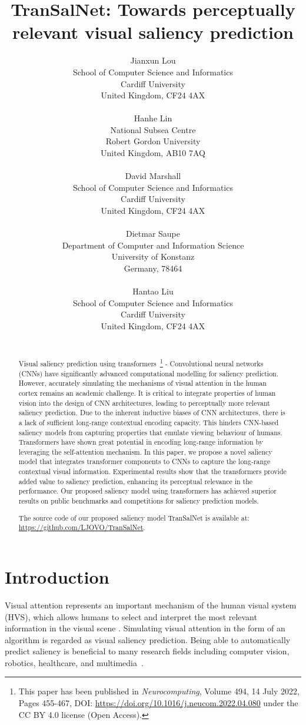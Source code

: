 \documentclass{article}
\title{TranSalNet: Towards perceptually relevant visual saliency prediction}
\date{}
\author{ 
Jianxun Lou \\
School of Computer Science and Informatics\\
Cardiff University\\
United Kingdom, CF24 4AX \\
\\
\And
Hanhe Lin \\
National Subsea Centre\\
Robert Gordon University\\
United Kingdom, AB10 7AQ \\
\\
\And
David Marshall \\
School of Computer Science and Informatics\\
Cardiff University\\
United Kingdom, CF24 4AX \\
\\
\And
Dietmar Saupe \\
Department of Computer and Information Science\\
University of Konstanz\\
Germany, 78464 \\
\\
\And
Hantao Liu \\
School of Computer Science and Informatics\\
Cardiff University\\
United Kingdom, CF24 4AX \\
\\
}
\begin{document}
\maketitle

\begin{abstract}
Visual saliency prediction using transformers~\footnote{This paper has been published in \textit{Neurocomputing}, Volume 494, 14 July 2022, Pages 455-467, DOI: \url{https://doi.org/10.1016/j.neucom.2022.04.080} under the CC BY 4.0 license (Open Access).} - Convolutional neural networks (CNNs) have significantly advanced computational modelling for saliency prediction. However, accurately simulating the mechanisms of visual attention in the human cortex remains an academic challenge. It is critical to integrate properties of human vision into the design of CNN architectures, leading to perceptually more relevant saliency prediction. Due to the inherent inductive biases of CNN architectures, there is a lack of sufficient long-range contextual encoding capacity. This hinders CNN-based saliency models from capturing properties that emulate viewing behaviour of humans. Transformers have shown great potential in encoding long-range information by leveraging the self-attention mechanism. In this paper, we propose a novel saliency model that integrates transformer components to CNNs to capture the long-range contextual visual information. Experimental results show that the transformers provide added value to saliency prediction, enhancing its perceptual relevance in the performance. Our proposed saliency model using transformers has achieved superior results on public benchmarks and competitions for saliency prediction models.

The source code of our proposed saliency model TranSalNet is available at: \url{https://github.com/LJOVO/TranSalNet}.
\end{abstract}



\section{Introduction}
Visual attention represents an important mechanism of the human visual system (HVS), which allows humans to select and interpret the most relevant information in the visual scene \cite{eyefix_Jonides}. Simulating visual attention in the form of an algorithm is regarded as visual saliency prediction. Being able to automatically predict saliency is beneficial to many research fields including computer vision, robotics, healthcare, and multimedia~\cite{Borji_2018, SONG2018218, HAN2021705, 6963384, CHEN202159, HAN201370, MISHRA202195}.
\end{document}
